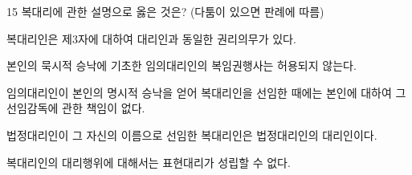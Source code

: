 \begin{question}{15}
복대리에 관한 설명으로 옳은 것은? (다툼이 있으면 판례에 따름)
\begin{choices}
  \item 복대리인은 제3자에 대하여 대리인과 동일한 권리의무가 있다.
  \item 본인의 묵시적 승낙에 기초한 임의대리인의 복임권행사는 허용되지 않는다.
  \item 임의대리인이 본인의 명시적 승낙을 얻어 복대리인을 선임한 때에는 본인에 대하여 그 선임감독에 관한 책임이 없다.
  \item 법정대리인이 그 자신의 이름으로 선임한 복대리인은 법정대리인의 대리인이다.
  \item 복대리인의 대리행위에 대해서는 표현대리가 성립할 수 없다.
\end{choices}
\end{question}
